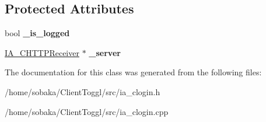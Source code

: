 \subsection*{Protected Attributes}
\begin{DoxyCompactItemize}
\item 
\mbox{\label{classIA__CLogin_a7bbc99c5295f47ddd12211f1a36fdcba}} 
bool {\bfseries \+\_\+is\+\_\+logged}
\item 
\mbox{\label{classIA__CLogin_a8d6964c91c74c684727c1a8981c8e3a0}} 
\hyperlink{classIA__CHTTPReceiver}{I\+A\+\_\+\+C\+H\+T\+T\+P\+Receiver} $\ast$ {\bfseries \+\_\+server}
\end{DoxyCompactItemize}


The documentation for this class was generated from the following files\+:\begin{DoxyCompactItemize}
\item 
/home/sobaka/\+Client\+Toggl/src/ia\+\_\+clogin.\+h\item 
/home/sobaka/\+Client\+Toggl/src/ia\+\_\+clogin.\+cpp\end{DoxyCompactItemize}
